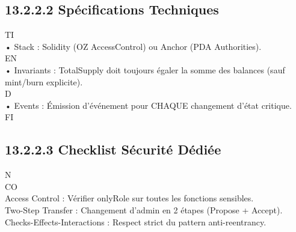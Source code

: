 \subsection{13.2.2.2 Spécifications Techniques}
\vspace{0.5em}
\vspace{0.5em}
\vspace{0.5em}
\vspace{0.5em}
TI\\
• Stack : Solidity (OZ AccessControl) ou Anchor (PDA Authorities).\\
\vspace{0.5em}
\vspace{0.5em}
\vspace{0.5em}
\vspace{0.5em}
EN\\
• Invariants : TotalSupply doit toujours égaler la somme des balances (sauf mint/burn explicite).\\
\vspace{0.5em}
\vspace{0.5em}
\vspace{0.5em}
\vspace{0.5em}
D\\
• Events : Émission d’événement pour CHAQUE changement d’état critique.\\
\vspace{0.5em}
\vspace{0.5em}
\vspace{0.5em}
\vspace{0.5em}
FI\\
\subsection{13.2.2.3 Checklist Sécurité Dédiée}
N\\
CO\\
Access Control : Vérifier onlyRole sur toutes les fonctions sensibles.\\
\vspace{0.5em}
Two-Step Transfer : Changement d’admin en 2 étapes (Propose + Accept).\\
\vspace{0.5em}
Checks-Effects-Interactions : Respect strict du pattern anti-reentrancy.\\
\vspace{0.5em}
\vspace{0.5em}
